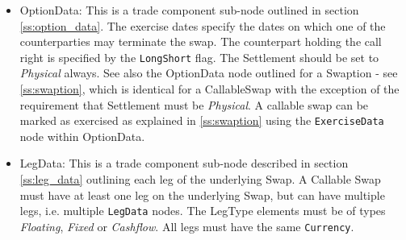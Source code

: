\begin{itemize}

\item OptionData: This is a trade component sub-node outlined in section \ref{ss:option_data}. The exercise dates
  specify the dates on which one of the counterparties may terminate the swap. The counterpart holding the call right is
  specified by the {\tt LongShort} flag. The Settlement should be set to \emph{Physical} always. See also the OptionData
  node outlined for a Swaption - see \ref{ss:swaption}, which is identical for a CallableSwap with the exception of the
  requirement that Settlement must be \emph{Physical}. A callable swap can be marked as exercised as explained in
  \ref{ss:swaption} using the \lstinline!ExerciseData! node within OptionData.

\item LegData: This is a trade component sub-node described in section \ref{ss:leg_data} outlining each leg of the
  underlying Swap. A Callable Swap must have at least one leg on the underlying Swap, but can have multiple legs,
  i.e. multiple \lstinline!LegData! nodes.  The LegType elements must be of types \emph{Floating}, \emph{Fixed} or
  \emph{Cashflow}. All legs must have the same \lstinline!Currency!.

\end{itemize}
